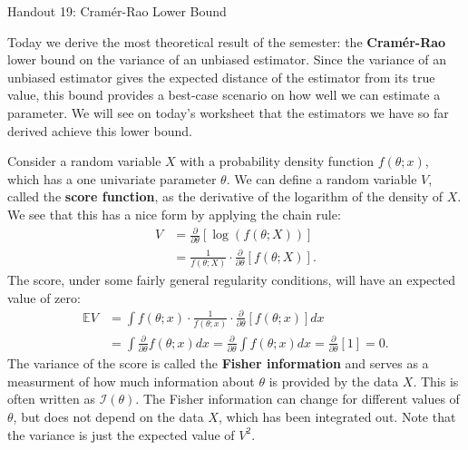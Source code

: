 \documentclass{tufte-handout}
\begin{document}
\justify

{\LARGE Handout 19: Cramér-Rao Lower Bound}

\vspace*{18pt}

\noindent
Today we derive the most theoretical result of the semester: the
\textbf{Cramér-Rao} lower bound on the variance of an
unbiased estimator. Since the variance of an unbiased estimator
gives the expected distance of the estimator from its true value,
this bound provides a best-case scenario on how well we can estimate
a parameter. We will see on today's worksheet that the estimators we
have so far derived achieve this lower bound.

Consider a random variable $X$ with a probability density function 
$f(\theta; x)$, which has a one univariate parameter $\theta$. We
can define a random variable $V$, called the \textbf{score function},
as the derivative of the logarithm of the density of $X$.
We see that this has a nice form by applying the chain rule:
\begin{align*}
V &= \frac{\partial}{\partial \theta} \left[ \log(f(\theta; X)) \right] \\
&= \frac{1}{f(\theta; X)} \cdot \frac{\partial}{\partial \theta} \left[ f(\theta; X) \right].
\end{align*}
The score, under some fairly general regularity conditions, will have an
expected value of zero:
\begin{align*}
\mathbb{E} V &= \int f(\theta; x) \cdot \frac{1}{f(\theta; x)} \cdot \frac{\partial}{\partial \theta} \left[ f(\theta; x) \right] dx \\
&= \int \frac{\partial}{\partial \theta} f(\theta; x) dx =
\frac{\partial}{\partial \theta} \int f(\theta; x) dx = \frac{\partial}{\partial \theta} \left[1\right] = 0.
\end{align*}
The variance of the score is called the \textbf{Fisher information}
and serves as a measurment of how much information about $\theta$ is
provided by the data $X$. This is often written as $\mathcal{I}(\theta)$.
The Fisher information can change for different values of $\theta$, but
does not depend on the data $X$, which has been integrated out. Note
that the variance is just the expected value of $V^2$. 
\end{document}
